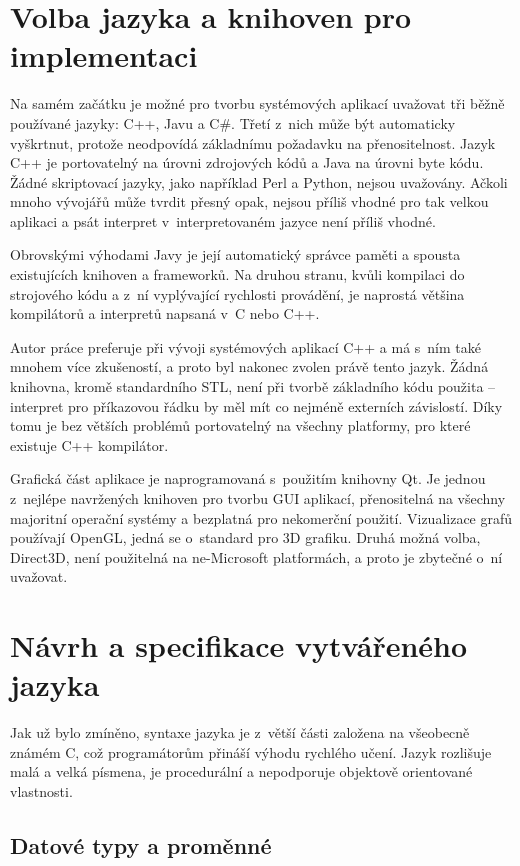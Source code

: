 \documentclass[11pt,twoside,a4paper]{book}
\begin{document}
\section{Volba jazyka a knihoven pro implementaci}

Na samém začátku je možné pro tvorbu sys\-té\-mo\-vých aplikací uvažovat tři běžně používané jazyky: C++, Javu a C\#. Třetí z~nich může být automaticky vyškrtnut, protože neodpovídá základnímu požadavku na přenositelnost. Jazyk C++ je portovatelný na úrovni zdrojových kódů a Java na úrovni byte kódu. Žádné skriptovací jazyky, jako například Perl a Python, nejsou uvažovány. Ačkoli mnoho vývojářů může tvrdit přesný opak, nejsou příliš vhodné pro tak velkou aplikaci a psát interpret v~interpretovaném jazyce není příliš vhodné.

Obrovskými výhodami Javy je její automatický správce paměti a spousta existujících knihoven a frameworků. Na druhou stranu, kvůli kompilaci do strojového kódu a z~ní vyplývající rychlosti provádění, je naprostá většina kompilátorů a interpretů napsaná v~C nebo C++.

Autor práce preferuje při vývoji systémových aplikací C++ a má s~ním také mnohem více zku\-še\-nos\-tí, a proto byl nakonec zvolen právě tento jazyk. Žádná knihovna, kromě standardního STL, není při tvorbě základního kódu použita -- interpret pro příkazovou řádku by měl mít co nejméně externích závislostí. Díky tomu je bez větších problémů portovatelný na všechny platformy, pro které existuje C++ kompilátor.

Grafická část aplikace je naprogramovaná s~použitím knihovny Qt. Je jednou z~nejlépe navržených knihoven pro tvorbu GUI aplikací, přenositelná na všechny majoritní operační systémy a bezplatná pro nekomerční použití. Vizualizace grafů používají OpenGL, jedná se o~standard pro 3D grafiku. Druhá možná volba, Direct3D, není použitelná na ne-Microsoft platformách, a proto je zbytečné o~ní uvažovat.


\section{Návrh a specifikace vytvářeného jazyka}

Jak už bylo zmíněno, syntaxe jazyka je z~větší části založena na všeobecně známém C, což programátorům přináší výhodu rychlého učení. Jazyk rozlišuje malá a velká písmena, je procedurální a nepodporuje objektově orientované vlastnosti.


\subsection{Datové typy a proměnné}
\label{datove_typy_a_promenne}
\end{document}

